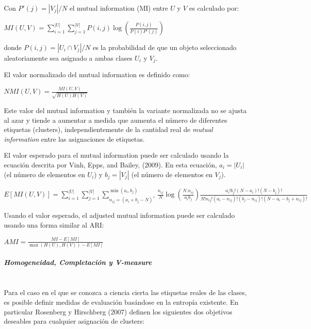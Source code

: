 Con $P'(j) = |V_j| / N$ el mutual information (MI) entre $U$ y $V$ es calculado por:

\begin{center}
	
	$MI(U, V) = \sum_{i=1}^{|U|}\sum_{j=1}^{|V|}P(i, j)\log(\frac{P(i,j)}{P(i)P'(j)})$
\end{center}

donde $P(i, j) = |U_i \cap V_j| /N$ es la probabilidad de que un objeto seleccionado aleatoriamente sea asignado a ambas clases $U_i$ y $V_j$.

El valor normalizado del mutual information es definido como:

\begin{center}
	
	$NMI(U, V) = \frac{MI(U, V)}{\sqrt{H(U)H(V)}}$
	
\end{center}
Este valor del mutual information y también la variante normalizada no se ajusta al azar y tiende a aumentar a medida que aumenta el número de diferentes etiquetas (clusters), independientemente de la cantidad real de \textit{mutual information} entre las asignaciones de etiquetas.

El valor esperado para el mutual information puede ser calculado usando la ecuación descrita por  Vinh, Epps, and Bailey, (2009). En esta ecuación, $a_i = |U_i|$ (el número de elementos en $U_i$) y $b_j = |V_j|$ (el número de elementos en $V_j$).
\begin{center}
	
	$E[MI(U,V)]=\sum_{i=1}^|U| \sum_{j=1}^|V| \sum_{n_{ij}=(a_i+b_j-N)^+ }^{\min(a_i, b_j)} \frac{n_{ij}}{N}\log ( \frac{ N.n_{ij}}{a_i b_j}) \frac{a_i!b_j!(N-a_i)!(N-b_j)!}{N!n_{ij}!(a_i-n_{ij})!(b_j-n_{ij})! (N-a_i-b_j+n_{ij})!}
	$
\end{center}

Usando el valor esperado, el adjusted mutual information puede ser calculado usando una forma similar al ARI:

\begin{center}
	
	$AMI = \frac{MI - E[MI]}{\max(H(U), H(V)) - E[MI]}$
\end{center}
\subparagraph{Homogeneidad, Completación y V-measure \\\\}

Para el caso en el que se conozca a ciencia cierta las etiquetas reales de las clases, es posible definir medidas de evaluación basándose en la entropía existente. En particular Rosenberg y Hirschberg (2007) \cite{sesentaiocho} definen los siguientes dos objetivos deseables para cualquier asignación de clusters:

